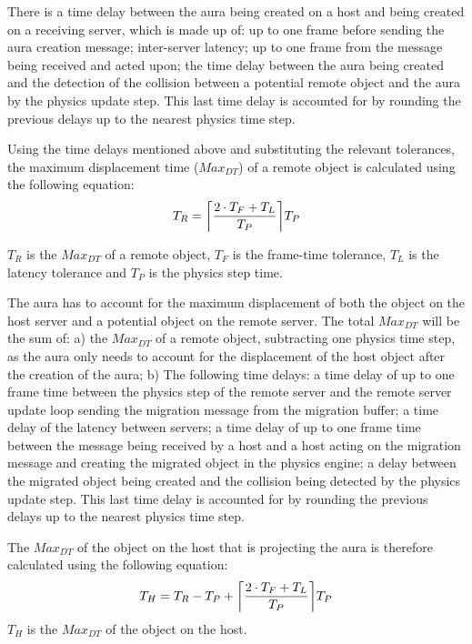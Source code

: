 There is a time delay between the aura being created on a host and being created on a receiving server, which is made up of: up to one frame before sending the aura creation message; inter-server latency; up to one frame from the message being received and acted upon; the time delay between the aura being created and the detection of the collision between a potential remote object and the aura by the physics update step. This last time delay is accounted for by rounding the previous delays up to the nearest physics time step.

Using the time delays mentioned above and substituting the relevant tolerances, the maximum displacement time ($Max_{DT}$) of a remote object is calculated using the following equation:
\DeclarePairedDelimiter\ceil{\lceil}{\rceil}
\begin{equation}
T_{R}=\ceil*{\frac{2\cdot T_{F} + T_{L}}{T_{P}}}T_{P}
\end{equation}

$T_{R}$ is the $Max_{DT}$ of a remote object, $T_{F}$ is the frame-time tolerance, $T_{L}$ is the latency tolerance and $T_{P}$ is the physics step time.

The aura has to account for the maximum displacement of both the object on the host server and a potential object on the remote server. The total $Max_{DT}$ will be the sum of: a) the $Max_{DT}$ of a remote object, subtracting one physics time step, as the aura only needs to account for the displacement of the host object after the creation of the aura; b) The following time delays: a time delay of up to one frame time between the physics step of the remote server and the remote server update loop sending the migration message from the migration buffer; a time delay of the latency between servers; a time delay of up to one frame time between the message being received by a host and a host acting on the migration message and creating the migrated object in the physics engine; a delay between the migrated object being created and the collision being detected by the physics update step. This last time delay is accounted for by rounding the previous delays up to the nearest physics time step.

The $Max_{DT}$ of the object on the host that is projecting the aura is therefore calculated using the following equation:
\begin{equation}
T_{H}=T_{R}-T_{P}+\ceil*{\frac{2\cdot T_{F} + T_{L}}{T_{P}}}T_{P}
\end{equation}
$T_{H}$ is the $Max_{DT}$ of the object on the host.

